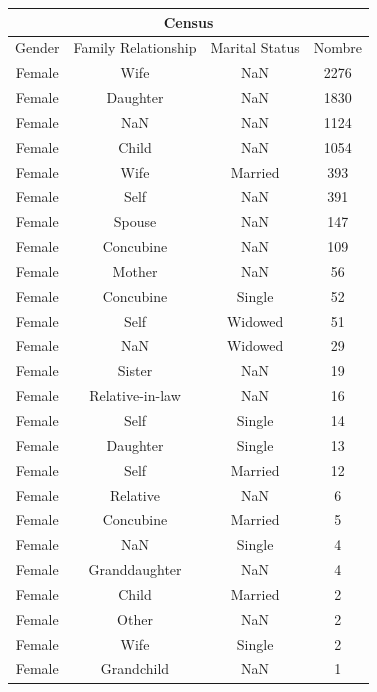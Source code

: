 \documentclass[a4paper,12pt,twoside]{book}
\begin{document}
            \begin{longtable}{|c|c|c|c|}
                \hline
                \multicolumn{4}{|c|}{Census} \\
                \hline
                Gender & Family Relationship & Marital Status & Nombre \\\hline
                Female & Wife & NaN & 2276 \\
                Female & Daughter & NaN & 1830 \\
                Female & NaN & NaN & 1124 \\
                Female & Child & NaN & 1054 \\
                Female & Wife & Married & 393 \\
                Female & Self & NaN & 391 \\
                Female & Spouse & NaN & 147 \\
                Female & Concubine & NaN & 109 \\
                Female & Mother & NaN & 56 \\
                Female & Concubine & Single & 52 \\
                Female & Self & Widowed & 51 \\
                Female & NaN & Widowed & 29 \\
                Female & Sister & NaN & 19 \\
                Female & Relative-in-law & NaN & 16 \\
                Female & Self & Single & 14 \\
                Female & Daughter & Single & 13 \\
                Female & Self & Married & 12 \\
                Female & Relative & NaN & 6 \\
                Female & Concubine & Married & 5 \\
                Female & NaN & Single & 4 \\
                Female & Granddaughter & NaN & 4 \\
                Female & Child & Married & 2 \\
                Female & Other & NaN & 2 \\
                Female & Wife & Single & 2 \\
                Female & Grandchild & NaN & 1 \\

\end{longtable}
\end{document}
